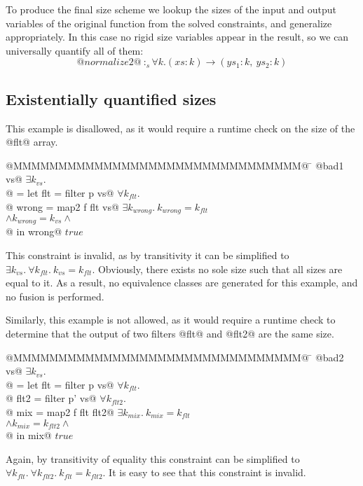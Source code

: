 To produce the final size scheme we lookup the sizes of the input and output variables of the original function from the solved constraints, and generalize appropriately. In this case no rigid size variables appear in the result, so we can universally quantify all of them:
$$@normalize2@ ~:_s \forall k. (xs : k) \to (ys_1 : k,~ ys_2 : k)
$$




\subsection{Existentially quantified sizes}


This example is disallowed, as it would require a runtime check on the size of the @flt@ array.
\begin{tabbing}
@MMMMMMMMMMMMMMMMMMMMMMMMMMMMMMMM@  \= \kill
@bad1 vs@                           \> $\exists k_{vs}.$ \\
@ = let flt   = filter p vs@        \> $\forall k_{flt}.$ \\
@       wrong = map2   f flt vs@    \> $\exists k_{wrong}.\ k_{wrong} = k_{flt}$ \\
                                    \> $\wedge k_{wrong} = k_{vs} \wedge$ \\
@   in  wrong@                      \> $true$
\end{tabbing}
This constraint is invalid, as by transitivity it can be simplified to $\exists k_{vs}.\ \forall k_{flt}.\ k_{vs} = k_{flt}$.
Obviously, there exists no sole size such that all sizes are equal to it.
As a result, no equivalence classes are generated for this example, and no fusion is performed.


Similarly, this example is not allowed, as it would require a runtime check to determine that the output of two filters @flt@ and @flt2@ are the same size.
\begin{tabbing}
@MMMMMMMMMMMMMMMMMMMMMMMMMMMMMMMM@  \= \kill
@bad2 vs@                           \> $\exists k_{vs}.$ \\
@ = let flt  = filter p  vs@        \> $\forall k_{flt}.$ \\
@       flt2 = filter p' vs@        \> $\forall k_{flt2}.$ \\
@       mix  = map2   f  flt flt2@  \> $\exists k_{mix}.\ k_{mix} = k_{flt}$ \\
                                    \> $\wedge k_{mix} = k_{flt2} \wedge$ \\
@   in  mix@                        \> $true$                               \\
\end{tabbing}
Again, by transitivity of equality this constraint can be simplified to $\forall k_{flt}.\ \forall k_{flt2}.\ k_{flt} = k_{flt2}$.
It is easy to see that this constraint is invalid.

